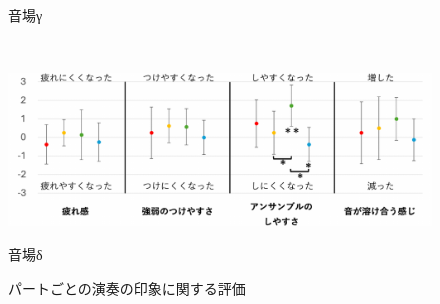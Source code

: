 \documentclass[11pt,a4j]{jreport}
\begin{document}
\begin{figure}[H]
\begin{minipage}{1\linewidth}
    \caption*{音場γ}
    \label{fig:演奏の印象γ}
  \end{minipage}
  \\
  \vspace{1\baselineskip}
  \begin{minipage}{1\linewidth}
    \centering
    \includegraphics[scale=.55]{images/subjectiveExp/statisticAnalysis/part_performance_d.pdf}
    \caption*{音場δ}
    \label{fig:演奏の印象δ}
  \end{minipage}
  
  \caption{パートごとの演奏の印象に関する評価}
  \label{fig:パートごとの演奏の印象に関する評価}
\end{figure}

\newpage
\end{document}
